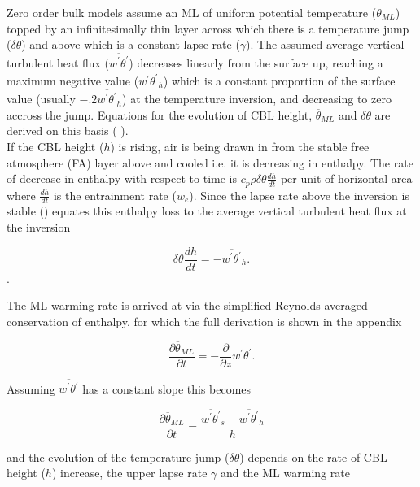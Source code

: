 Zero order bulk models assume an \acs{ML} of uniform potential temperature ($\overline{\theta}_{ML}$) topped by an infinitesimally thin layer across which there is a temperature jump ($\delta \theta$) and above which is a constant lapse rate ($\gamma$).  The assumed average vertical turbulent heat flux ($\overline{w^{'}\theta^{'}}$) decreases linearly from the surface up, reaching a maximum negative value ($\overline{w^{'}\theta^{'}}_{h}$) which is a constant proportion of the surface value (usually $-.2\overline{w^{'}\theta^{'}}_{h}$) at the temperature inversion, and decreasing to zero accross the jump.  Equations for the evolution of \acs{CBL} height, $\overline{\theta}_{ML}$ and $\delta \theta$ are derived on this basis (\citeauthor{Tennekes73} \citeyear{Tennekes73}).\\

If the \acs{CBL} height ($h$) is rising, air is being drawn in from the stable free atmosphere (FA) layer above and cooled i.e. it is decreasing in enthalpy.  The rate of decrease in enthalpy with respect to time is $c_{p}\rho \delta \theta \frac{dh}{dt}$ per unit of horizontal area where $\frac{dh}{dt}$ is the entrainment rate ($w_{e}$).  Since the lapse rate above the inversion is stable \citeauthor{Tennekes73} (\citeyear{Tennekes73}) equates this enthalpy loss to the average vertical turbulent heat flux at the inversion

\begin{equation}
\delta \theta \frac{dh}{dt} = -\overline{w^{'}\theta^{'}}_{h}. 
\end{equation}.  

The \acs{ML} warming rate is arrived at via the simplified Reynolds averaged conservation of enthalpy, for which the full derivation is shown in the appendix

\begin{equation}
\frac{\partial \overline{\theta}_{ML}}{\partial t} = -\frac{\partial}{\partial z}\overline{w^{'}\theta^{'}}.
\end{equation}

Assuming $\overline{w^{'}\theta^{'}}$ has a constant slope this becomes

\begin{equation}
\frac{\partial \overline{\theta}_{ML}}{\partial t} = \frac{\overline{w^{'}\theta^{'}}_{s}-\overline{w^{'}\theta^{'}}_{h}}{h}
\end{equation}

and the evolution of the temperature jump ($\delta \theta$) depends on the rate of \acs{CBL} height ($h$) increase, the upper lapse rate $\gamma$ and the \acs{ML} warming rate
  
